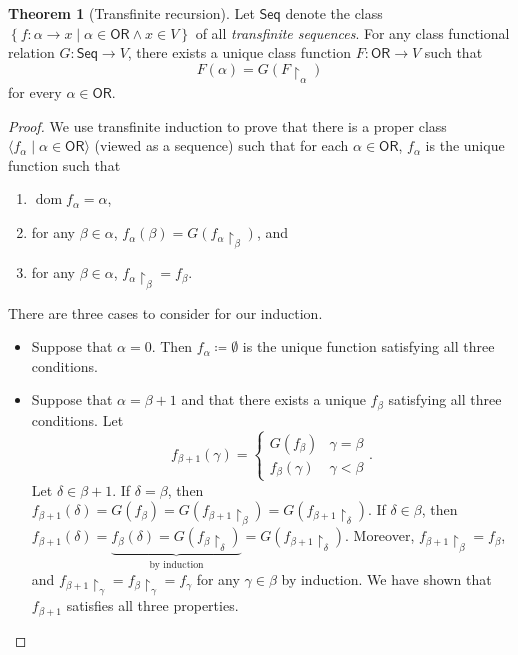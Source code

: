 \documentclass[10pt,letterpaper,cm]{nupset}
\theoremstyle{definition}
\theoremstyle{theorem}
\newtheorem{theorem}[definition]{Theorem}
\theoremstyle{remark}
\newcommand{\1}{\mathbf{1}}
\newcommand{\0}{\vec 0}
\newcommand{\ord}{\mathsf{OR}}
\DeclareMathOperator{\dom}{dom}
\begin{document}
\begin{theorem}[Transfinite recursion]
Let $\mathsf{Seq}$ denote the class $\left\{ f : \alpha \to x \mid \alpha \in \ord \land x\in V\right\}$ of all \textit{transfinite sequences}. For any class functional relation $G:\mathsf{Seq} \to V$, there exists a unique class function $F: \ord \to V$ such that $$ F(\alpha) =G(F\restriction_{\alpha})    $$ for every $\alpha \in \ord$.
\end{theorem}
\begin{proof}
We use transfinite induction to prove that there is a proper class $\langle f_{\alpha} \mid \alpha \in \ord \rangle$ (viewed as a sequence) such that for each $\alpha \in \ord$,  $f_{\alpha}$ is the unique function such that 
\begin{enumerate}[label=(\roman*)]
\item $\dom{f_{\alpha}} = \alpha$,
\item for any $\beta \in \alpha$, $f_{\alpha}(\beta)= G(f_{\alpha}\restriction_{\beta})$, and
\item for any $\beta \in \alpha$, $f_{\alpha}\restriction_{\beta} = f_{\beta}$.
\end{enumerate}
There are three cases to consider for our induction.
\begin{itemize}
\item Suppose that $\alpha = 0$. Then $f_{\alpha} \coloneqq \emptyset$ is the unique function satisfying all three conditions. 
\item Suppose that $\alpha = \beta +1$ and that there exists a unique $f_{\beta}$ satisfying all three conditions. Let
\[ 
f_{\beta+1}(\gamma) =
\begin{cases}
G(f_{\beta}) & \gamma = 	\beta
\\ f_{\beta}(\gamma) & \gamma < \beta
\end{cases}.
\] Let $\delta \in \beta +1$.  If $\delta = \beta$, then $f_{\beta+1}(\delta) = G(f_{\beta}) = G(f_{\beta+1}\restriction_{\beta}) = G(f_{\beta+1}\restriction_{\delta}) .$ If $\delta \in \beta$, then $f_{\beta+1}(\delta) = \underbrace{f_{\beta}(\delta) = G(f_{\beta}\restriction_{\delta})}_{\text{by induction}} = G(f_{\beta+1}\restriction_{\delta})$. 
Moreover, $f_{\beta +1}\restriction_{\beta} = f_{\beta}$, and $f_{\beta +1}\restriction_{\gamma} = f_{\beta}\restriction_{\gamma} = f_{\gamma}$ for any $\gamma \in \beta$ by induction. We have shown that $f_{\beta +1}$ satisfies all three properties. 


\end{itemize}
\end{proof}
\end{document}
